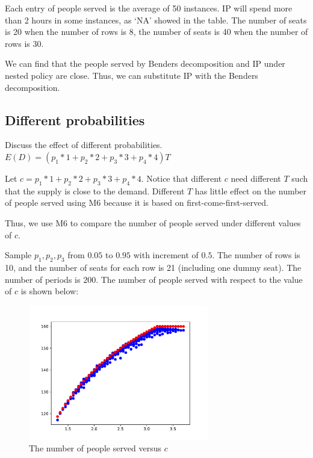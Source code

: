 Each entry of people served is the average of 50 instances.
IP will spend more than 2 hours in some instances, as `NA' showed in the table.
The number of seats is 20 when the number of rows is 8, the number of seats is 40 when the number of rows is 30.

We can find that the people served by Benders decomposition and IP under nested policy are close. Thus, we can substitute IP with the Benders decomposition.


\subsection{Different probabilities}
Discuss the effect of different probabilities.
$E(D) = (p_1 * 1 + p_2 * 2 + p_3 * 3 + p_4 * 4) T$

Let $c = p_1 * 1 + p_2 * 2 + p_3 * 3 + p_4 * 4$. Notice that different $c$ need different $T$ such that the supply is close to the demand. Different $T$ has little effect on the number of people served using M6 because it is based on first-come-first-served. 

Thus, we use M6 to compare the number of people served under different values of $c$.

Sample $p_1, p_2, p_3$ from $0.05$ to $0.95$ with increment of $0.5$. The number of rows is 10, and the number of seats for each row is 21 (including one dummy seat). The number of periods is $200$. The number of people served with respect to the value of $c$ is shown below:


\begin{figure}[ht]
  \centering
  \includegraphics[width = 0.7\textwidth]{./Figures/diff_2.pdf}
  \caption{The number of people served versus $c$}
\end{figure}


